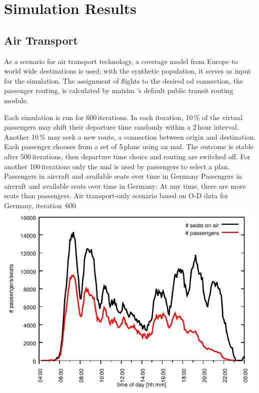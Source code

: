 %

\section{Simulation Results}
\label{sec:air_rail_results}
\subsection{Air Transport}
As a scenario for air transport technology, a coverage model from Europe to world wide destinations is used; 
with the synthetic population, it serves as input for the simulation.
The assignment of flights to the desired \gls{od} connection, \ie the passenger routing, is calculated by \gls{matsim} 's default public transit routing module.

Each simulation is run for 600\,iterations.
In each iteration, 10\,\% of the virtual passengers may shift their departure time randomly within a 2\,hour interval.
Another 10\,\% may seek a new route, \ie a connection between origin and destination. 
Each passenger chooses from a set of 5\,plans using an \gls{mnl}.
The outcome is stable after 500\,iterations, then departure time choice and routing are switched off. 
For another 100\,iterations only the \gls{mnl} is used by  passengers to select a plan. 
%
\createfigure%
{Passengers in aircraft and available seats over time in Germany}%
{Passengers in aircraft and available seats over time in Germany: At any time, there are more seats than passengers. Air transport-only scenario based on O-D data for Germany, iteration~600}%
{\label{fig:2009_passengers_seats}}%
{\includegraphics[width=0.99\textwidth, angle=0]{./extending/figures/air/in_vehicle_histogram_flight_1876_it_600.pdf}}%
{}

